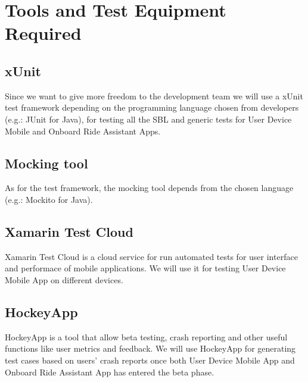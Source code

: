 \section{Tools and Test Equipment Required}
\subsection{xUnit}
Since we want to give more freedom to the development team we will use a xUnit test framework depending on the programming language chosen from developers (e.g.:  JUnit for Java), for testing all the SBL and generic tests for User Device Mobile and Onboard Ride Assistant Apps.

\subsection{Mocking tool}
As for the test framework, the mocking tool depends from the chosen language (e.g.: Mockito for Java).

\subsection{Xamarin Test Cloud}
Xamarin Test Cloud is a cloud service for run automated tests for user interface and performace of mobile applications. We will use it for testing User Device Mobile App on different devices.

\subsection{HockeyApp}
HockeyApp is a tool that allow beta testing, crash reporting and other useful functions like user metrics and feedback. We will use HockeyApp for generating test cases based on users' crash reports once both User Device Mobile App and Onboard Ride Assistant App has entered the beta phase. 
